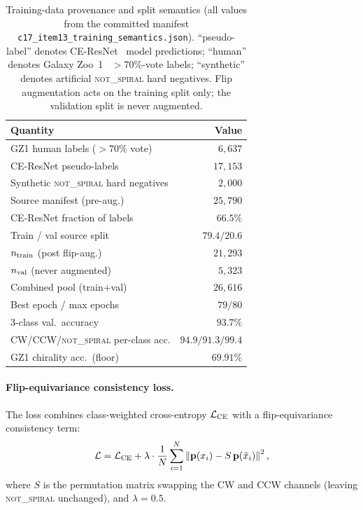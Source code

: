 \documentclass[aps,prd,twocolumn,superscriptaddress,preprintnumbers,nofootinbib,longbibliography,floatfix]{revtex4-2}
\newcommand{\NS}{\textsc{not\_spiral}}
\begin{document}
\begin{table}[t]
\caption{\label{tab:training_provenance}Training-data provenance and split semantics (all values from the committed manifest \texttt{c17\_item13\_training\_semantics.json}). ``pseudo-label'' denotes CE-ResNet~\cite{Jia:2023} model predictions; ``human'' denotes Galaxy Zoo~1~\cite{Lintott:2008} $>\!70\%$-vote labels; ``synthetic'' denotes artificial \NS{} hard negatives. Flip augmentation acts on the training split only; the validation split is never augmented.}
\begin{ruledtabular}
\begin{tabular}{lr}
\textbf{Quantity} & \textbf{Value} \\
\hline
GZ1 human labels ($>\!70\%$ vote) & $6{,}637$ \\
CE-ResNet pseudo-labels & $17{,}153$ \\
Synthetic \NS{} hard negatives & $2{,}000$ \\
Source manifest (pre-aug.) & $25{,}790$ \\
CE-ResNet fraction of labels & $66.5\%$ \\
Train / val source split & $79.4/20.6$ \\
$n_{\rm train}$ (post flip-aug.) & $21{,}293$ \\
$n_{\rm val}$ (never augmented) & $5{,}323$ \\
Combined pool (train${+}$val) & $26{,}616$ \\
Best epoch / max epochs & $79/80$ \\
3-class val.\ accuracy & $93.7\%$ \\
CW/CCW/\NS{} per-class acc. & $94.9/91.3/99.4$ \\
GZ1 chirality acc.\ (floor) & $69.91\%$ \\
\end{tabular}
\end{ruledtabular}
\end{table}

\paragraph{Flip-equivariance consistency loss.}
The loss combines class-weighted cross-entropy $\mathcal{L}_{\rm CE}$ with a flip-equivariance consistency term:
\begin{equation}
\mathcal{L} = \mathcal{L}_{\rm CE} + \lambda \cdot \frac{1}{N}\sum_{i=1}^{N} \left\| \mathbf{p}(x_i) - S\,\mathbf{p}(\tilde{x}_i) \right\|^2 , \label{eq:loss}
\end{equation}
where $S$ is the permutation matrix swapping the CW and CCW channels (leaving \NS{} unchanged), and $\lambda = 0.5$.
\end{document}
